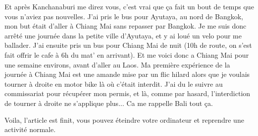 \begin{multicols}{2}
Et après Kanchanaburi me direz vous, c'est vrai que ça fait un bout de temps que vous n'aviez pas nouvelles. J'ai pris le bus pour Ayutaya, au nord de Bangkok, mon but était d'aller à Chiang Mai sans repasser par Bangkok. Je me suis donc arrêté une journée dans la petite ville d'Ayutaya, et y ai loué un velo pour me ballader. J'ai ensuite pris un bus pour Chiang Mai de nuit (10h de route, on s'est fait offrir le cafe à 6h du mat' en arrivant). Et me voici donc a Chiang Mai pour une semaine environs, avant d'aller au Laos. Ma première expérience de la journée à Chiang Mai est une amande mise par un flic hilard alors que je voulais tourner à droite en motor bike là où c'était interdit. J'ai du le suivre au commissariat pour récupérer mon permis, et là, comme par hasard, l'interdiction de tourner à droite ne s'applique plus... Ca me rappelle Bali tout ça.

Voila, l'article est finit, vous pouvez éteindre votre ordinateur et reprendre une activité normale.

\end{multicols}


